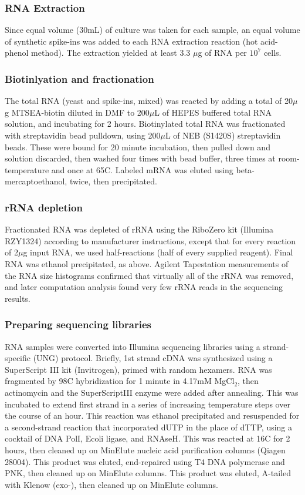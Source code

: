 \subsubsection{RNA Extraction}

Since equal volume (30mL) of culture was taken for each sample, an equal
volume of synthetic spike-ins was added to each RNA extraction reaction
(hot acid-phenol method).
The extraction yielded at least 3.3 \(\mu\)g of RNA per \(10^7\) cells.

\subsubsection{Biotinlyation and fractionation}

The total RNA (yeast and spike-ins, mixed) was reacted by adding
a total of 20$\mu$g MTSEA-biotin diluted in DMF to
200$\mu$L of HEPES buffered total RNA solution, 
and incubating for 2 hours.
Biotinylated total RNA was fractionated with streptavidin bead
pulldown, using 200\(\mu\)L of NEB (S1420S) streptavidin beads. 
These were bound for 20 minute incubation, then pulled down and
solution discarded, then washed four times with bead buffer, three
times at room-temperature and once at 65C. Labeled mRNA was eluted
using beta-mercaptoethanol, twice, then precipitated.

\subsubsection{rRNA depletion}

Fractionated RNA was depleted of rRNA using the RiboZero kit (Illumina
RZY1324) according to manufacturer instructions, except that for
every reaction of 2\(\mu\)g input RNA, we used half-reactions 
(half of every supplied reagent). 
Final RNA was ethanol precipitated, as above. Agilent
Tapestation measurements of the RNA size histograms confirmed that
virtually all of the rRNA was removed, and later computation analysis
found very few rRNA reads in the sequencing results.

\subsubsection{Preparing sequencing libraries}

RNA samples were converted into Illumina sequencing libraries using a
strand-specific (UNG) protocol.  Briefly, 1st strand cDNA was 
synthesized using a SuperScript III kit
(Invitrogen), primed with random hexamers. RNA was fragmented by
98C hybridization for 1 minute in 4.17mM MgCl$_2$, then actinomycin
and the SuperScriptIII enzyme were added after annealing.  
This was incubated to extend first strand in a series of increasing
temperature steps over the course of an hour.
This reaction was ethanol precipitated
and resuspended for a second-strand reaction that incorporated dUTP
in the place of dTTP, using a cocktail of DNA PolI, Ecoli ligase, and
RNAseH. This was reacted at 16C for 2 hours, then cleaned up on
MinElute nucleic acid purification columns (Qiagen 28004).
This product was eluted, end-repaired using T4 DNA polymerase and PNK,
then cleaned up on MinElute columns.
This product was eluted, A-tailed with Klenow (exo-), 
then cleaned up on MinElute columns.

